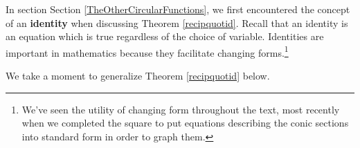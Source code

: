 \documentclass{ximera}
\begin{document}
	\author{Stitz-Zeager}




\setcounter{footnote}{0}

\label{FundamentalTrigonometricIdentities}

\smallskip

In section Section \ref{TheOtherCircularFunctions}, we first encountered the concept of an \textbf{identity} when discussing Theorem \ref{recipquotid}.   Recall that an identity is an equation which is true regardless of the choice of variable.  Identities are important in mathematics because they facilitate changing forms.\footnote{We've seen the utility of changing form throughout the text, most recently when we completed the square to put equations describing the conic sections into standard form in order to graph them.}

\smallskip

We take a moment to generalize Theorem \ref{recipquotid} below. 
\smallskip


\end{document}
